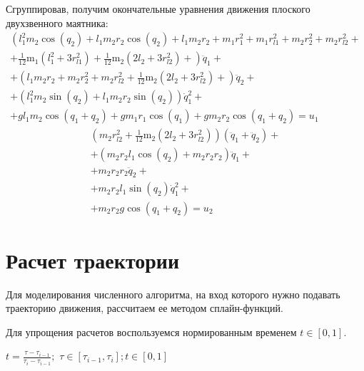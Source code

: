 \documentclass[a4paper,14pt]{extreport}
\begin{document}
Сгруппировав, получим окончательные уравнения движения плоского двухзвенного маятника:
\begin{eqnarray}
\left( l_{1}^{2} m_{2} \cos{\left (q_{2} \right )}
+ l_{1} m_{2} r_{2} \cos{\left (q_{2} \right )} + l_{1} m_{2} r_{2} + m_{1} r_{1}^{2} + m_{1} r_{l1}^{2} +  m_{2} r_{2}^{2} +  m_{2} r_{l2}^{2} +\nonumber\right.\\\left. 
+ \frac{1}{12} \operatorname{m_{1}}{\left (l_{1}^{2} + 3 r_{l1}^{2} \right )} + \frac{1}{12} \operatorname{m_{2}}{\left (2 l_{2} + 3 r_{l2}^{2} \right )} + 
\right) \ddot{q}_1 +\nonumber\\+
\left(
 l_{1} m_{2} r_{2} +  m_{2} r_{2}^{2} +  m_{2} r_{l2}^{2} + \frac{1}{12} \operatorname{m_{2}}{\left (2 l_{2} + 3 r_{l2}^{2} \right )}
+ \right) \ddot{q}_2 +\nonumber\\+
\left(
l_{1}^{2} m_{2} \sin{\left (q_{2} \right )}  + l_{1} m_{2} r_{2} \sin{\left (q_{2} \right )} 
\right)\dot{q}_1^{2} +\nonumber\\
+ g l_{1} m_{2} \cos{\left (q_{1} + q_{2} \right )} + g m_{1} r_{1} \cos{\left (q_{1} \right )} + g m_{2} r_{2} \cos{\left (q_{1} + q_{2} \right )} = u_{1}\nonumber
\end{eqnarray}
\begin{eqnarray}
\left(m_{2} r_{l2}^{2} + \frac{1}{12} \operatorname{m_{2}}{\left (2 l_{2} + 3 r_{l2}^{2} \right )}\right) \left(\ddot{q}_1 + \ddot{q}_2\right) + \nonumber \\
+\left(m_{2} r_{2} l_{1} \cos{\left (q_{2} \right )} + m_{2} r_{2} r_{2}\right)
\ddot{q}_1 + \nonumber \\
 + m_{2} r_{2}  r_{2} \ddot{q}_2 + \nonumber \\
 + m_{2} r_{2} l_{1} \sin{\left (q_{2} \right )} \dot{q}_1^{2} +\nonumber\\
+ m_{2} r_{2} g \cos{\left (q_{1} + q_{2} \right )} = u_{2}\nonumber
\end{eqnarray}

\newpage
\section{Расчет траектории}

Для моделирования численного алгоритма, на вход которого нужно подавать траекторию движения, рассчитаем ее методом сплайн-функций.

Для упрощения расчетов воспользуемся нормированным временем $t \in [0, 1]$.

\begin{center}
	$t = \frac{\tau - \tau_{i-1}}{\tau_{i} - \tau_{i-1}};$
	$\tau \in [\tau_{i-1}, \tau_{i}]; t \in [0, 1]$	
	\\
\end{center}
\end{document}
